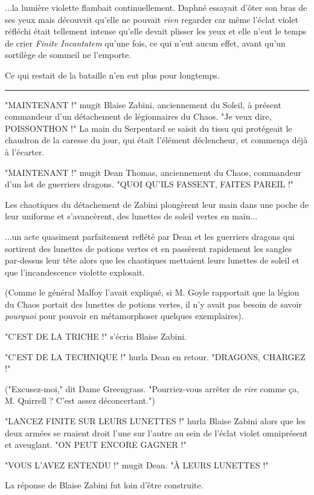 ...la lumière violette flambait continuellement. Daphné essayait d'ôter son bras de ses yeux mais découvrit qu'elle ne pouvait \emph{rien}  regarder car même l'éclat violet réfléchi était tellement intense qu'elle devait plisser les yeux et elle n'eut le temps de crier \emph{Finite Incantatem}  qu'une fois, ce qui n'eut aucun effet, avant qu'un sortilège de sommeil ne l'emporte.

Ce qui restait de la bataille n'en eut plus pour longtemps.
\par\noindent\rule{\textwidth}{0.4pt}
"MAINTENANT !" mugit Blaise Zabini, anciennement du Soleil, à présent commandeur d'un détachement de légionnaires du Chaos. "Je veux dire, POISSONTHON !" La main du Serpentard se saisit du tissu qui protégeait le chaudron de la caresse du jour, qui était l'élément déclencheur, et commença déjà à l'écarter.

"MAINTENANT !" mugit Dean Thomas, anciennement du Chaos, commandeur d'un lot de guerriers dragons. "QUOI QU'ILS FASSENT, FAITES PAREIL !"

Les chaotiques du détachement de Zabini plongèrent leur main dans une poche de leur uniforme et s'avancèrent, des lunettes de soleil vertes en main...

...un acte quasiment parfaitement reflété par Dean et les guerriers dragons qui sortirent des lunettes de potions vertes et en passèrent rapidement les sangles par-dessus leur tête alors que les chaotiques mettaient leurs lunettes de soleil et que l'incandescence violette explosait.

(Comme le général Malfoy l'avait expliqué, si M. Goyle rapportait que la légion du Chaos portait des lunettes de potions vertes, il n'y avait pas besoin de savoir \emph{pourquoi}  pour pouvoir en métamorphoser quelques exemplaires).

"C'EST DE LA TRICHE !" s'écria Blaise Zabini.

"C'EST DE LA TECHNIQUE !" hurla Dean en retour. "DRAGONS, CHARGEZ !"

("Excusez-moi," dit Dame Greengrass. "Pourriez-vous arrêter de \emph{rire}  comme ça, M. Quirrell ? C'est assez déconcertant.")

"LANCEZ FINITE SUR LEURS LUNETTES !" hurla Blaise Zabini alors que les deux armées se ruaient droit l'une sur l'autre au sein de l'éclat violet omniprésent et aveuglant. "ON PEUT ENCORE GAGNER !"

"VOUS L'AVEZ ENTENDU !" mugit Dean. "À LEURS LUNETTES !"

La réponse de Blaise Zabini fut loin d'être construite.

